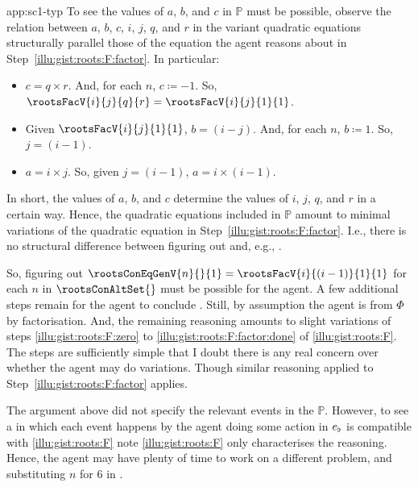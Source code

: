\begin{note}
\begin{dets}{app:sc1-typ}
    \noindent%
    To see the values of \(a\), \(b\), and \(c\) in \(\mathbb{P}\) must be possible, observe the relation between \(a\), \(b\), \(c\), \(i\), \(j\), \(q\), and \(r\) in the variant quadratic equations structurally parallel those of the equation the agent reasons about in Step~\ref{illu:gist:roots:F:factor}.
    In particular:
    \begin{itemize}
    \item
      \(c = q \times r\).
      And, for each \(n\), \(c \coloneq -1\).
      So, \(\rootsFacV{i}{j}{q}{r} =\rootsFacV{i}{j}{1}{1}\).
    \item
      Given \(\rootsFacV{i}{j}{1}{1}\), \(b = (i - j)\).
      And, for each \(n\), \(b \coloneq 1\).
      So, \(j = (i - 1)\).
    \item
      \(a = i \times j\).
      So, given \(j = (i - 1)\), \(a = i \times (i - 1)\).
    \end{itemize}
    In short, the values of \(a\), \(b\), and \(c\) determine the values of \(i\), \(j\), \(q\), and \(r\) in a certain way.
    Hence, the quadratic equations included in \(\mathbb{P}\) amount to minimal variations of the quadratic equation in Step~\ref{illu:gist:roots:F:factor}.
    I.e., there is no structural difference between figuring out  and, e.g., .
    \smallskip

    \noindent%
    So, figuring out \(\rootsConEqGenV{n}{}{1} = \rootsFacV{i}{(i - 1)}{1}{1}\) for each \(n\) in \(\rootsConAltSet{}\) must be possible for the agent.
    A few additional steps remain for the agent to conclude .
    Still, by assumption the agent is \tCV{}  from \(\Phi\) by factorisation.
    And, the remaining reasoning amounts to slight variations of steps \ref{illu:gist:roots:F:zero} to \ref{illu:gist:roots:F:factor:done} of \autoref{illu:gist:roots:F}.
    The steps are sufficiently simple that I doubt there is any real concern over whether the agent may do variations.
    Though similar reasoning applied to Step~\ref{illu:gist:roots:F:factor} applies.
    \medskip

    \noindent%
    The argument above did not specify the relevant events in the \tpro{} \(\mathbb{P}\).
    However, to see a \tpro{} in which each event happens by the agent doing some action in \(e\sb{\flat}\) is compatible with \autoref{illu:gist:roots:F} note \autoref{illu:gist:roots:F} only characterises the \agents{} reasoning.
    Hence, the agent may have plenty of time to work on a different problem, and substituting \(n\) for \(6\) in \rootsConEq{}.
  \end{dets}
\end{note}



